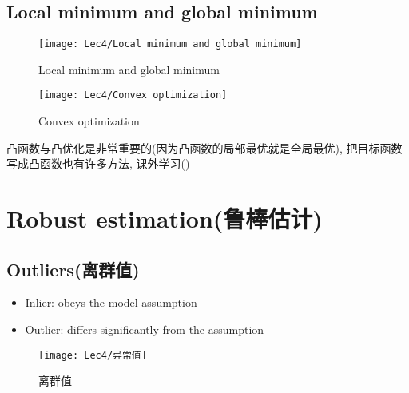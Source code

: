     \subsection{Local minimum and global minimum}
    \begin{figure}[H]
        \centering
        \texttt{[image: Lec4/Local minimum and global minimum]}
        \caption{Local minimum and global minimum}
    \end{figure}
    \begin{figure}[H]
        \centering
        \texttt{[image: Lec4/Convex optimization]}
        \caption{Convex optimization}
    \end{figure}
    凸函数与凸优化是非常重要的(因为凸函数的局部最优就是全局最优), 把目标函数写成凸函数也有许多方法, 课外学习()

    \section{Robust estimation(鲁棒估计)}
    
    \subsection{Outliers(离群值)}
    \begin{itemize}
        \item Inlier: obeys the model assumption
        \item Outlier: differs significantly from the assumption
    \end{itemize}
    \begin{figure}[H]
        \centering
        \texttt{[image: Lec4/异常值]}
        \caption{离群值}
    \end{figure}
